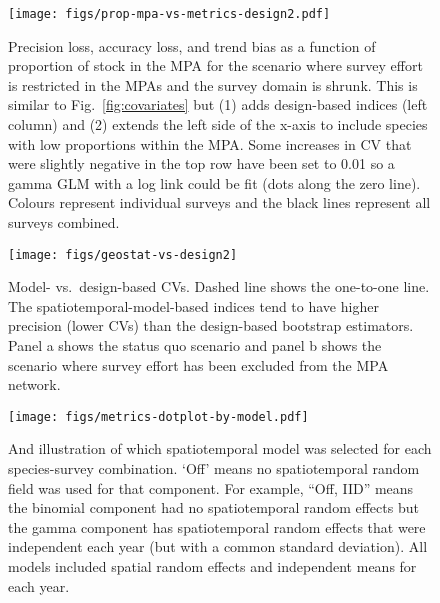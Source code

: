 \documentclass[12pt]{article}
\begin{document}

\begin{figure}[htb]
    \centering
    \texttt{[image: figs/prop-mpa-vs-metrics-design2.pdf]}
    \caption{Precision loss, accuracy loss, and trend bias as a function of proportion of stock in the MPA for the scenario where survey effort is restricted in the MPAs and the survey domain is shrunk. This is similar to Fig.~\ref{fig:covariates} but (1) adds design-based indices (left column) and (2) extends the left side of the x-axis to include species with low proportions within the MPA. Some increases in CV that were slightly negative in the top row have been set to 0.01 so a gamma GLM with a log link could be fit (dots along the zero line). Colours represent individual surveys and the black lines represent all surveys combined.}
    \label{fig:covariates-design}
\end{figure}

\clearpage

\begin{figure}[htb]
    \centering
    \texttt{[image: figs/geostat-vs-design2]}
    \caption{Model- vs.\ design-based CVs. Dashed line shows the one-to-one line. The spatiotemporal-model-based indices tend to have higher precision (lower CVs) than the design-based bootstrap estimators. Panel a shows the status quo scenario and panel b shows the scenario where survey effort has been excluded from the MPA network.}
    \label{fig:design-model-cv}
\end{figure}

\clearpage

\begin{figure}[htb]
    \centering
    \texttt{[image: figs/metrics-dotplot-by-model.pdf]}
    \caption{And illustration of which spatiotemporal model was selected for each species-survey combination. `Off' means no spatiotemporal random field was used for that component. For example, ``Off, IID'' means the binomial component had no spatiotemporal random effects but the gamma component has spatiotemporal random effects that were independent each year (but with a common standard deviation). All models included spatial random effects and independent means for each year.}
    \label{fig:metrics-by-model}
\end{figure}

\clearpage
\end{document}
